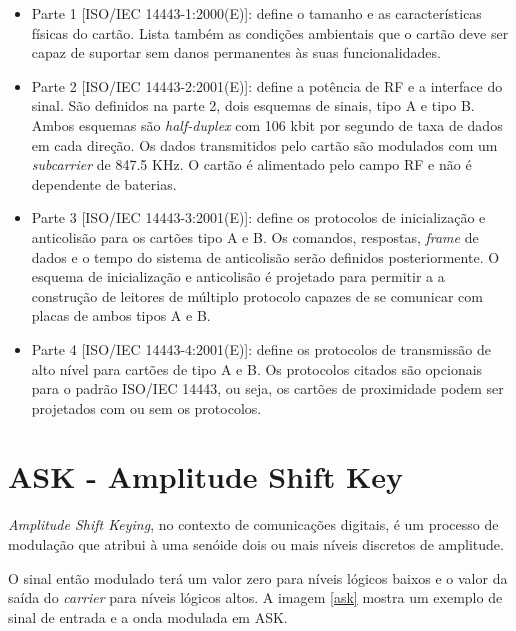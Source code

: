 \begin{itemize}

\item Parte 1 [ISO/IEC 14443-1:2000(E)]: define o tamanho e as características físicas do cartão. Lista também as condições ambientais que o cartão deve ser capaz de suportar sem danos permanentes às suas funcionalidades.

\item Parte 2 [ISO/IEC 14443-2:2001(E)]: define a potência de RF e a interface do sinal. São definidos na parte 2, dois esquemas de sinais, tipo A e tipo B. Ambos esquemas são \textit{half-duplex} com 106 kbit por segundo de taxa de dados em cada direção. Os dados transmitidos pelo cartão são modulados com um \textit{subcarrier} de 847.5 KHz. O cartão é alimentado pelo campo RF e não é dependente de baterias.

\item Parte 3 [ISO/IEC 14443-3:2001(E)]: define os protocolos de inicialização e anticolisão para os cartões tipo A e B. Os comandos, respostas, \textit{frame} de dados e o tempo do sistema de anticolisão serão definidos posteriormente. O esquema de inicialização e anticolisão é projetado para permitir a a construção de leitores de múltiplo protocolo capazes de se comunicar com placas de ambos tipos A e B.

\item Parte 4 [ISO/IEC 14443-4:2001(E)]: define os protocolos de transmissão de alto nível para cartões de tipo A e B. Os protocolos citados são opcionais para o padrão ISO/IEC 14443, ou seja, os cartões de proximidade podem ser projetados com ou sem os protocolos.\cite{14443} 

\end{itemize}

\newpage

\section{ASK - Amplitude Shift Key}

\textit{Amplitude Shift Keying}, no contexto de comunicações digitais, é um processo de modulação que atribui à uma senóide dois ou mais níveis discretos de amplitude. \cite{uri}

O sinal então modulado terá um valor zero para níveis lógicos baixos e o valor da saída do \textit{carrier} para níveis lógicos altos. A imagem \ref{ask} mostra um exemplo de sinal de entrada e a onda modulada em ASK.


